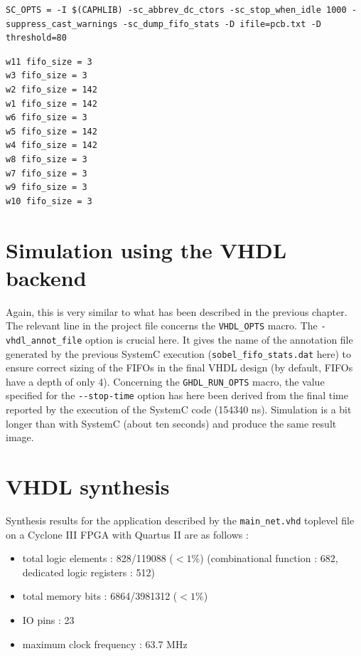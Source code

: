 \begin{lstlisting}[style=MakeStyle,caption={Application-specific \texttt{Makefile} for simulating
    wth SystemC the application given in Listing.~\ref{lst:sobel-full}},label={lst:sobel-makef-sysc}]
SC_OPTS = -I $(CAPHLIB) -sc_abbrev_dc_ctors -sc_stop_when_idle 1000 -suppress_cast_warnings -sc_dump_fifo_stats -D ifile=pcb.txt -D threshold=80 
\end{lstlisting}

\begin{lstlisting}[style=CaphStyle,caption={File \texttt{sobel\_fifo\_stats.dat} produced by the SystemC backend for 
    the application given in Listing.~\ref{lst:sobel-full}},label={lst:sobel-sysc-fifos}]
w11 fifo_size = 3
w3 fifo_size = 3
w2 fifo_size = 142
w1 fifo_size = 142
w6 fifo_size = 3
w5 fifo_size = 142
w4 fifo_size = 142
w8 fifo_size = 3
w7 fifo_size = 3
w9 fifo_size = 3
w10 fifo_size = 3
\end{lstlisting}

\section{Simulation using the VHDL backend}

Again, this is very similar to what has been described in the previous chapter. The relevant line in
the project file concerns the \verb|VHDL_OPTS| macro. The \verb|-vhdl_annot_file| option is crucial
here. It gives the name of the annotation file generated by the
previous SystemC execution (\verb|sobel_fifo_stats.dat| here) to ensure correct sizing of the
FIFOs in the final VHDL design (by default, FIFOs have a depth of only 4). Concerning the
\verb|GHDL_RUN_OPTS| macro,  the value specified for
the \verb|--stop-time| option has here been derived from the final time reported by the execution of
the SystemC code (154340 ns). Simulation is a bit longer than with SystemC (about ten seconds) and
produce the same result image.

\section{VHDL synthesis}
\label{sec:vhdl-synthesis-4}

Synthesis results for the application described by the \verb|main_net.vhd| toplevel file on a Cyclone III
FPGA with Quartus II are as follows :
\begin{itemize}
\item total logic elements : 828/119088 ($<1\%$) (combinational function : 682, dedicated logic registers : 512)
\item total memory bits : 6864/3981312 ($<1\%$)
\item IO pins : 23
\item maximum clock frequency : 63.7 MHz
\end{itemize}


